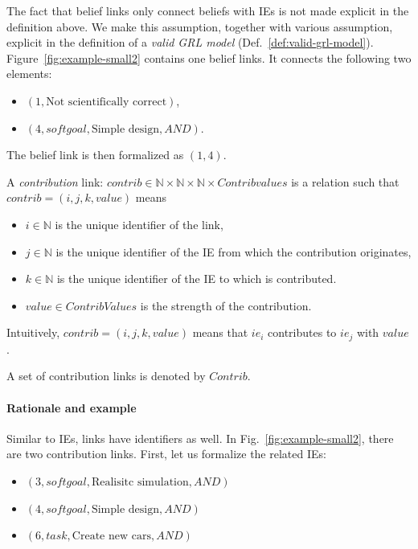 The fact that belief links only connect beliefs with IEs is not made explicit in the definition above. We make this assumption, together with various assumption, explicit in the definition of a \emph{valid GRL model} (Def.~\ref{def:valid-grl-model}). Figure~\ref{fig:example-small2} contains one belief links. It connects the following two elements:
\begin{itemize}
\item $(1, \text{Not scientifically correct})$,
\item $(4, softgoal, \text{Simple design}, AND)$.
\end{itemize}
The belief link is then formalized as $(1, 4)$.

\begin{definition}
\label{def:link:contrib}
A \emph{contribution} link: $contrib\in \mathbb{N}\times\mathbb{N}\times\mathbb{N}\times Contribvalues$ is a relation such that $contrib = (i,j,k,value)$ means
\begin{itemize}
\item $i\in \mathbb{N}$ is the unique identifier of the link,
\item $j\in \mathbb{N}$ is the unique identifier of the IE from which the contribution originates,
\item $k\in \mathbb{N}$ is the unique identifier of the IE to which is contributed.
\item $value\in ContribValues$ is the strength of the contribution.
\end{itemize}
Intuitively, $contrib = (i,j,k,value)$ means that $ie_i$ contributes to $ie_j$ with $value$.

A set of contribution links is denoted by $Contrib$.
\end{definition}

\paragraph{Rationale and example} Similar to IEs, links have identifiers as well. In Fig.~\ref{fig:example-small2}, there are two contribution links. First, let us formalize the related IEs:
\begin{itemize}
\item $(3, softgoal, \text{Realisitc simulation}, AND)$
\item $(4, softgoal, \text{Simple design}, AND)$
\item $(6, task, \text{Create new cars}, AND)$
\end{itemize}

